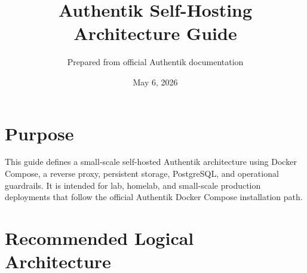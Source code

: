 \documentclass[11pt]{article}
\title{Authentik Self-Hosting Architecture Guide}\author{Prepared from official Authentik documentation}\date{May 6, 2026}
\begin{document}
\maketitle

\section*{Purpose}
This guide defines a small-scale self-hosted Authentik architecture using Docker Compose, a reverse proxy, persistent storage, PostgreSQL, and operational guardrails. It is intended for lab, homelab, and small-scale production deployments that follow the official Authentik Docker Compose installation path.

\section*{Recommended Logical Architecture}
\end{document}
